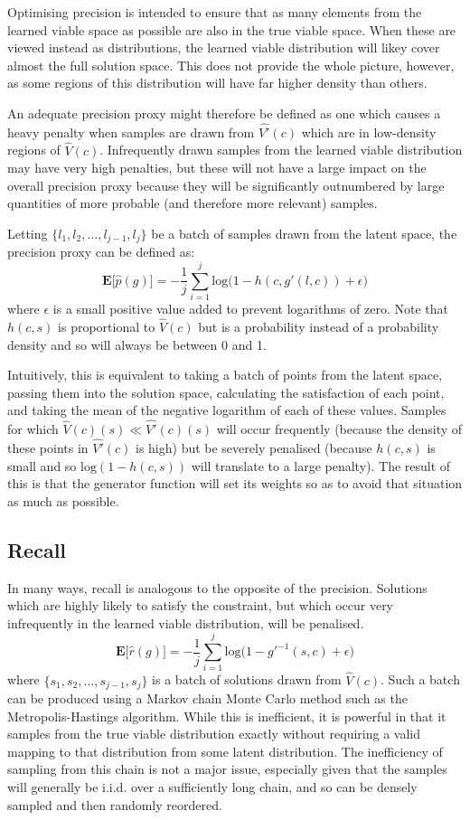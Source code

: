 \documentclass[../../main.tex]{subfiles}
\begin{document}
Optimising precision is intended to ensure that as many elements from the learned viable space as possible are also in the true viable space.
When these are viewed instead as distributions, the learned viable distribution will likey cover almost the full solution space.
This does not provide the whole picture, however, as some regions of this distribution will have far higher density than others.

An adequate precision proxy might therefore be defined as one which causes a heavy penalty when samples are drawn from $\hat{V'}(c)$ which are in low-density regions of $\hat{V}(c)$.
Infrequently drawn samples from the learned viable distribution may have very high penalties, but these will not have a large impact on the overall precision proxy because they will be significantly outnumbered by large quantities of more probable (and therefore more relevant) samples.

Letting $\{l_1, l_2, ..., l_{j-1}, l_j\}$ be a batch of samples drawn from the latent space, the precision proxy can be defined as:
$$\textbf{E}\big[\hat{p}(g)\big] = -\frac{1}{j}\sum_{i=1}^{j}
\text{log} \big( 1 - h(c,g'(l, c)) + \epsilon \big)
$$
where $\epsilon$ is a small positive value added to prevent logarithms of zero.
Note that $h(c, s)$ is proportional to $\hat{V}(c)$ but is a probability instead of a probability density and so will always be between 0 and 1.

Intuitively, this is equivalent to taking a batch of points from the latent space, passing them into the solution space, calculating the satisfaction of each point, and taking the mean of the negative logarithm of each of these values.
Samples for which $\hat{V}(c)(s) \ll \hat{V'}(c)(s)$ will occur frequently (because the density of these points in $\hat{V'}(c)$ is high) but be severely penalised (because $h(c, s)$ is small and so $\text{log}(1 - h(c, s))$ will translate to a large penalty).
The result of this is that the generator function will set its weights so as to avoid that situation as much as possible.

\subsection{Recall}

In many ways, recall is analogous to the opposite of the precision.
Solutions which are highly likely to satisfy the constraint, but which occur very infrequently in the learned viable distribution, will be penalised.
$$\textbf{E}\big[\hat{r}(g)\big] = -\frac{1}{j}\sum_{i=1}^{j}
\text{log} \big( 1 - g'^{-1}(s, c) + \epsilon \big)
$$
where $\{s_1, s_2, ..., s_{j-1}, s_j\}$ is a batch of solutions drawn from $\hat{V}(c)$.
Such a batch can be produced using a Markov chain Monte Carlo method such as the Metropolis-Hastings algorithm.
While this is inefficient, it is powerful in that it samples from the true viable distribution exactly without requiring a valid mapping to that distribution from some latent distribution.
The inefficiency of sampling from this chain is not a major issue, especially given that the samples will generally be i.i.d. over a sufficiently long chain, and so can be densely sampled and then randomly reordered.
\end{document}
